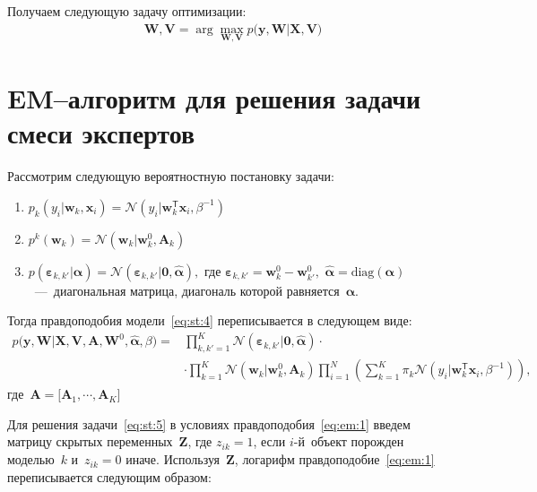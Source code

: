 \documentclass[12pt, twoside]{article}
\numberwithin{equation}{section}
\begin{document}
Получаем следующую задачу оптимизации:
\begin{equation}
\label{eq:st:5}
\begin{aligned}
\mathbf{W}, \mathbf{V} = \arg\max_{\mathbf{W}, \mathbf{V}} p\bigr(\mathbf{y}, \mathbf{W}|\mathbf{X}, \mathbf{V}\bigr)
\end{aligned}
\end{equation}

\section{EM--алгоритм для решения задачи смеси экспертов}
Рассмотрим следующую вероятностную постановку задачи:
\begin{enumerate}
	\item $p_{k}\left(y_{i}|\mathbf{w}_{k}, \mathbf{x}_{i}\right) = \mathcal{N}\left(y_{i}|\mathbf{w}_{k}^{\mathsf{T}}\mathbf{x}_{i}, \beta^{-1}\right)$
	\item $p^{k}\left(\mathbf{w}_{k}\right) = \mathcal{N}\left(\mathbf{w}_{k}|\mathbf{w}^{0}_{k}, \mathbf{A}_{k}\right)$
	\item $p\left(\bm{\varepsilon}_{k,k'}|\bm{\alpha}\right) = \mathcal{N}\left(\bm{\varepsilon}_{k,k'}|\mathbf{0},  \hat{\bm{\alpha}}\right),$ где $\bm{\varepsilon}_{k,k'} = \mathbf{w}_{k}^{0}-\mathbf{w}_{k'}^{0},$ $\hat{\bm{\alpha}} = \text{diag}\left(\bm{\alpha}\right)$~---~диагональная матрица, диагональ которой равняется~$\bm{\alpha}$.
\end{enumerate}
Тогда правдоподобия модели~\eqref{eq:st:4} переписывается в следующем виде:
\begin{equation}
\label{eq:em:1}
\begin{aligned}
p\bigr(\mathbf{y}, \mathbf{W}|\mathbf{X}, \mathbf{V}, \textbf{A}, \textbf{W}^{0}, \hat{\bm{\alpha}}, \beta\bigr) = &\prod_{k,k'=1}^{K}\mathcal{N}\left(\bm{\varepsilon}_{k,k'}|\mathbf{0},  \hat{\bm{\alpha}}\right)\cdot\\
&\cdot\prod_{k=1}^{K}\mathcal{N}\left(\mathbf{w}_{k}|\mathbf{w}^{0}_{k}, \mathbf{A}_{k}\right)\prod_{i=1}^{N}\left(\sum_{k=1}^{K}\pi_{k}\mathcal{N}\left(y_{i}|\mathbf{w}_{k}^{\mathsf{T}}\mathbf{x}_{i}, \beta^{-1}\right)\right),
\end{aligned}
\end{equation}
где~$\mathbf{A} = \bigr[\mathbf{A}_1, \cdots, \mathbf{A}_K\bigr]$

Для решения задачи~\eqref{eq:st:5} в условиях правдоподобия~\eqref{eq:em:1} введем матрицу скрытых переменных~$\mathbf{Z}$, где $z_{ik} = 1$, если $i$-й~объект порожден моделью~$k$ и~$z_{ik} = 0$ иначе. Используя~$\mathbf{Z}$, логарифм правдоподобие~\eqref{eq:em:1} переписывается следующим образом:
\end{document}
